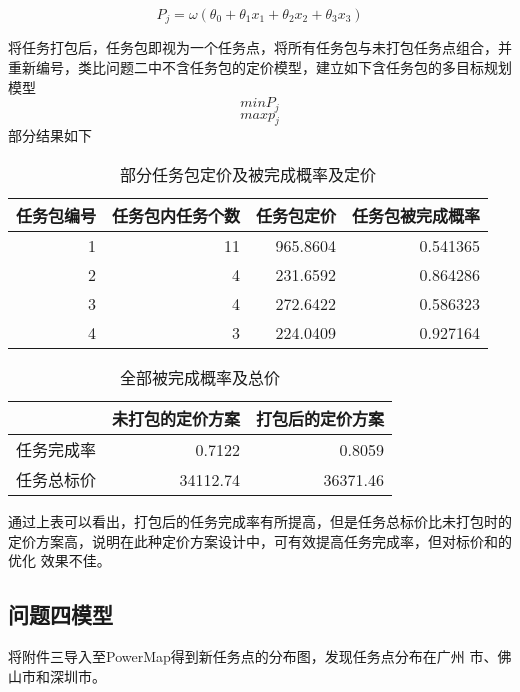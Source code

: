 \documentclass{cumcmthesis}
\begin{document}
\begin{equation}
\left.
P_j=\omega\left(\theta_0+\theta_1x_1+\theta_2x_2+\theta_3x_3\right)
\right.
\end{equation}

将任务打包后，任务包即视为一个任务点，将所有任务包与未打包任务点组合，并 重新编号，类比问题二中不含任务包的定价模型，建立如下含任务包的多目标规划模型
\[
min P_j
\]
\[
max p_j
\]
部分结果如下

\begin{table}[!htbp]
	\caption{ 部分任务包定价及被完成概率及定价}\label{tab001} \centering
\begin{tabular}{rrrr}
	\toprule[1.5pt]
	\multicolumn{1}{l}{任务包编号} & \multicolumn{1}{l}{ 任务包内任务个数 } & \multicolumn{1}{l}{任务包定价} & \multicolumn{1}{l}{ 任务包被完成概率 } \\
	\midrule[1pt]
	1     & 11    & 965.8604 & 0.541365 \\
	2     & 4     & 231.6592 & 0.864286 \\
	3     & 4     & 272.6422 & 0.586323 \\
	4     & 3     & 224.0409 & 0.927164 \\
		\bottomrule[1.5pt]
\end{tabular}%

\end{table}



\begin{table}[!htbp]
	\caption{ 全部被完成概率及总价}\label{tab001} \centering
    \begin{tabular}{lrr}
    \toprule[1.5pt]
	& \multicolumn{1}{l}{未打包的定价方案 } & \multicolumn{1}{l}{ 打包后的定价方案} \\
	\midrule[1pt]
	任务完成率  & 0.7122 & 0.8059 \\
	任务总标价  & 34112.74 & 36371.46 \\
		\bottomrule[1.5pt]
\end{tabular}%
\end{table}

通过上表可以看出，打包后的任务完成率有所提高，但是任务总标价比未打包时的 定价方案高，说明在此种定价方案设计中，可有效提高任务完成率，但对标价和的优化 效果不佳。

\subsection{问题四模型}

将附件三导入至PowerMap得到新任务点的分布图，发现任务点分布在广州 市、佛山市和深圳市。
\end{document}
